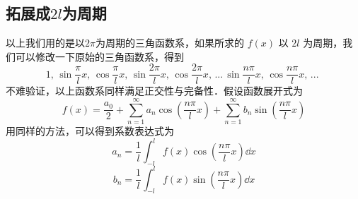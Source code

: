 \subsection{拓展成$2l$为周期}
以上我们用的是以$2\pi $为周期的三角函数系，如果所求的 $f(x)$ 以 $2l$ 为周期，我们可以修改一下原始的三角函数系，得到
\begin{equation}
1,\,\sin \frac{\pi}{l}x,\,\cos \frac{\pi }{l}x,\,\sin \frac{{2\pi }}{l}x,\,\cos \frac{{2\pi }}{l}x,\,...\,\sin \frac{{n\pi }}{l}x,\,\cos \frac{{n\pi }}{l}x,\,...\,\,
\end{equation}
不难验证，以上函数系同样满足正交性与完备性．假设函数展开式为
\begin{equation}
f( x ) = \frac{{{a_0}}}{2} + \sum\limits_{n = 1}^\infty {{a_n}\cos (\frac{{n\pi }}{l}x) + } \sum\limits_{n = 1}^\infty {{b_n}\sin (\frac{{n\pi }}{l}x)}
\end{equation}
用同样的方法，可以得到系数表达式为
\begin{equation}
a_n = \frac{1}{l}\int_{ - l}^l f( x )\cos (\frac{{n\pi }}{l}x) \dd{x}
\end{equation}
\begin{equation}
b_n = \frac{1}{l}\int_{-l}^l f( x )\sin (\frac{{n\pi }}{l}x) \dd{x}
\end{equation}
